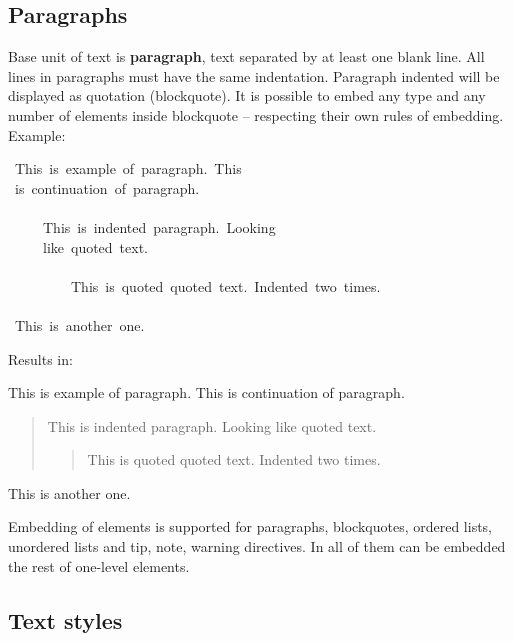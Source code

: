 \documentclass[12pt]{article}
\begin{document}
\subsection{Paragraphs}

Base unit of text is \textbf{paragraph}, text separated by at least one blank
line. All lines in paragraphs must have the same indentation. Paragraph
indented will be displayed as quotation (blockquote). It is possible to
embed any type and any number of elements inside blockquote -- respecting
their own rules of embedding. Example:

\begin{ttfamily}\begin{flushleft}
\mbox{~This~is~example~of~paragraph.~This}\\
\mbox{~is~continuation~of~paragraph.}\\
\mbox{}\\
\mbox{~~~~~This~is~indented~paragraph.~Looking}\\
\mbox{~~~~~like~quoted~text.}\\
\mbox{}\\
\mbox{~~~~~~~~~This~is~quoted~quoted~text.~Indented~two~times.}\\
\mbox{}\\
\mbox{~This~is~another~one.}\\
\end{flushleft}\end{ttfamily}

Results in:

This is example of paragraph. This
is continuation of paragraph.

 \begin{quotation}
 This is indented paragraph. Looking
 like quoted text.

 \begin{quotation}
 This is quoted quoted text. Indented two times.
 \end{quotation}
 \end{quotation}

This is another one.

Embedding of elements is supported for paragraphs, blockquotes, ordered
lists, unordered lists and tip, note, warning directives. In all of them
can be embedded the rest of one-level elements.

\hypertarget{ltext-styles}{}
\subsection{Text styles}
\end{document}
